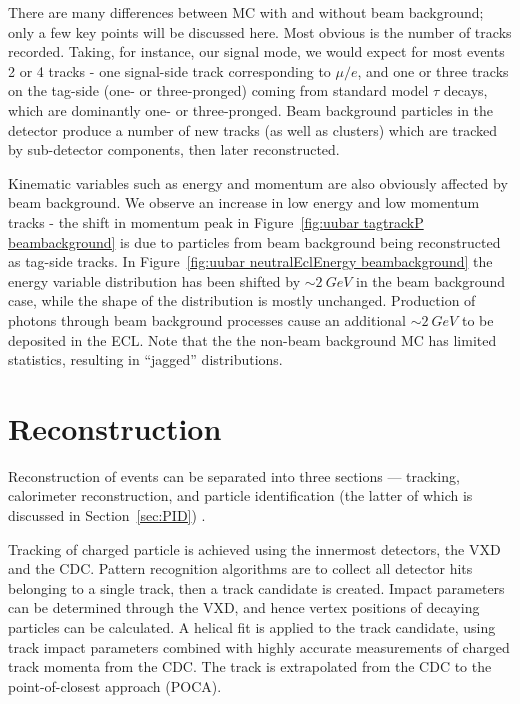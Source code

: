 \documentclass[12pt]{thesis}  %
\begin{document}
    
There are many differences between MC with and without beam background; only a few key points will be discussed here. Most obvious is the number of tracks recorded. Taking, for instance, our signal mode, we would expect for most events 2 or 4 tracks - one signal-side track corresponding to $\mu/e$, and one or three tracks on the tag-side (one- or three-pronged) coming from standard model $\tau$ decays, which are dominantly one- or three-pronged. Beam background particles in the detector produce a number of new tracks (as well as clusters) which are tracked by sub-detector components, then later reconstructed.

Kinematic variables such as energy and momentum are also obviously affected by beam background. We observe an increase in low energy and low momentum tracks - the shift in momentum peak in Figure~\ref{fig:uubar tagtrackP beambackground} is due to particles from beam background being reconstructed as tag-side tracks. In Figure~\ref{fig:uubar neutralEclEnergy beambackground} the energy variable distribution has been shifted by $\sim\SI{2}{GeV}$ in the beam background case, while the shape of the distribution is mostly unchanged. Production of photons through beam background processes cause an additional $\sim\SI{2}{GeV}$ to be deposited in the ECL. Note that the the non-beam background MC has limited statistics, resulting in ``jagged'' distributions.



\pagebreak

\chapter{Reconstruction}

Reconstruction of events can be separated into three sections --- tracking, calorimeter reconstruction, and particle identification (the latter of which is discussed in Section~\ref{sec:PID}) \cite{BelleII:reconstruction}.

Tracking of charged particle is achieved using the innermost detectors, the VXD and the CDC. Pattern recognition algorithms are to collect all detector hits belonging to a single track, then a track candidate is created. Impact parameters can be determined through the VXD, and hence vertex positions of decaying particles can be calculated. A helical fit is applied to the track candidate, using track impact parameters combined with highly accurate measurements of charged track momenta from the CDC. The track is extrapolated from the CDC to the point-of-closest approach (POCA).
\end{document}
